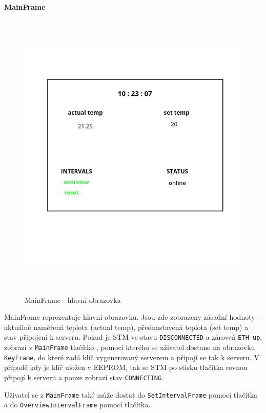 \paragraph{MainFrame}
\begin{figure}[H]\centering
\includegraphics[width=140mm, height=140mm]{../img/main_frame_online.jpg}
\caption{MainFrame - hlavní obrazovka}
\label{main-frame}
\end{figure}

MainFrame reprezentuje hlavní obrazovku.
Jsou zde zobrazeny zásadní hodnoty - aktuálně naměřená teplota (actual temp), přednastavená teplota
(set temp) a stav připojení k serveru.
Pokud je STM ve stavu \texttt{DISCONNECTED} a zároveň \texttt{ETH-up}, zobrazí v \texttt{MainFrame}
tlačítko , pomocí kterého se uživatel dostane na obrazovku \texttt{KeyFrame}, do které zadá klíč
vygenerovaný serverem a připojí se tak k serveru.
V případě kdy je klíč uložen v EEPROM, tak se STM po stisku tlačítka  rovnou připojí k serveru
a pouze zobrazí stav \texttt{CONNECTING}.

Uživatel se z \texttt{MainFrame} také může dostat do \texttt{SetIntervalFrame} pomocí 
tlačítka a do \texttt{OverviewIntervalFrame} pomocí  tlačítka.

